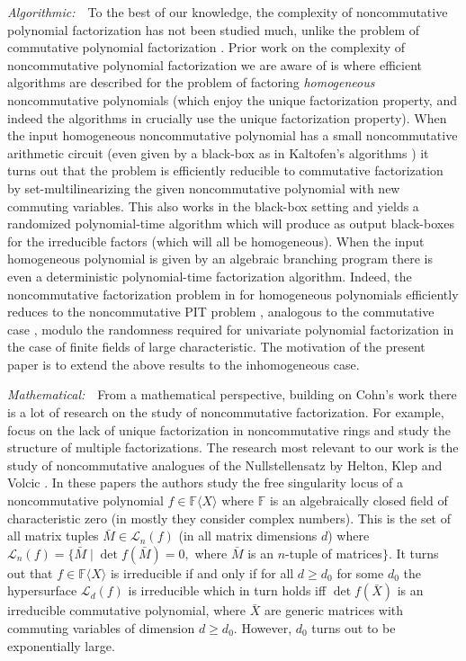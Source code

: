 \documentclass[10pt,a4paper]{article}
\newcommand{\F}{\mathbb{F}}
\renewcommand{\angle}[1]{\langle #1 \rangle}
\newcommand{\FX}{\F\angle{X}}
\begin{document}
\noindent\textit{Algorithmic:}~~To the best of our knowledge, the
complexity of noncommutative polynomial factorization has not been
studied much, unlike the problem of commutative polynomial
factorization \cite{vzg-book,K89,KT90}.  Prior work on the complexity
of noncommutative polynomial factorization we are aware of is
\cite{AJR18} where efficient algorithms are described for the problem
of factoring \emph{homogeneous} noncommutative polynomials (which
enjoy the unique factorization property, and indeed the algorithms in \cite{AJR18} crucially use the unique factorization property). When the input homogeneous
noncommutative polynomial has a small noncommutative arithmetic
circuit (even given by a black-box as in Kaltofen's algorithms
\cite{K89, KT90}) it turns out that the problem is efficiently
reducible to commutative factorization by set-multilinearizing the
given noncommutative polynomial with new commuting variables. This
also works in the black-box setting and yields a randomized
polynomial-time algorithm which will produce as output black-boxes for
the irreducible factors (which will all be homogeneous). When the
input homogeneous polynomial is given by an algebraic branching
program there is even a deterministic polynomial-time factorization
algorithm. Indeed, the noncommutative factorization problem in for
homogeneous polynomials efficiently reduces to the noncommutative PIT
problem \cite{AJR18}, analogous to the commutative case \cite{KSS14},
modulo the randomness required for univariate polynomial factorization
in the case of finite fields of large characteristic. The motivation
of the present paper is to extend the above results to the
inhomogeneous case.\smallskip

\noindent\textit{Mathematical:}~~From a mathematical perspective,
building on Cohn's work there is a lot of research on the study of
noncommutative factorization. For example, \cite{BS15,BHL17} focus on
the lack of unique factorization in noncommutative rings and study the
structure of multiple factorizations. The research most relevant to
our work is the study of noncommutative analogues of the
Nullstellensatz by Helton, Klep and Volcic \cite{HKV18,HKV20}. In  
these papers the authors study the free singularity locus of a
noncommutative polynomial $f\in\FX$ where $\F$ is an algebraically
closed field of characteristic zero (in \cite{HKV20} mostly they
consider complex numbers). This is the set of all matrix tuples
$\bar{M}\in\mathcal{L}_n(f)$ (in all matrix dimensions $d$) where
$\mathcal{L}_n(f)=\{\bar{M}\mid \det f(\bar{M}) = 0,$ where $\bar{M}$
is an $n$-tuple of matrices$\}$.  It turns out that $f\in\FX$ is
irreducible if and only if for all $d\ge d_0$ for some $d_0$ the
hypersurface $\mathcal{L}_d(f)$ is irreducible which in turn holds iff
$\det f(\bar{X})$ is an irreducible commutative polynomial, where
$\bar{X}$ are generic matrices with commuting variables of dimension
$d\ge d_0$. However, $d_0$ turns out to be exponentially large.
\end{document}
